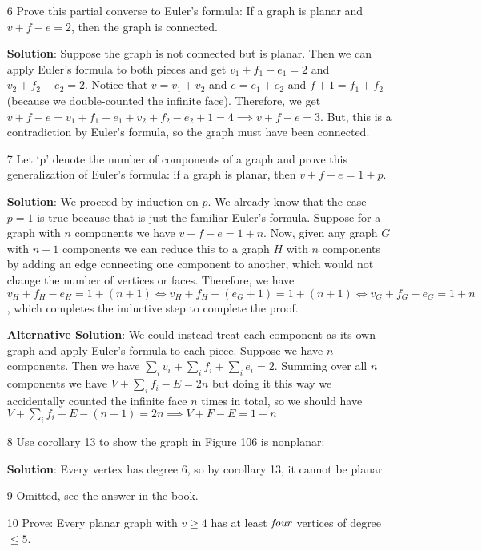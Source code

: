 \documentclass{article}
\begin{document}
\begin{enumerate}
	\item[6] Prove this partial converse to Euler's formula: If a graph is planar and $v + f - e = 2$, then the graph is connected.
	
	\textbf{Solution}: Suppose the graph is not connected but is planar. Then we can apply Euler's formula to both pieces and get $v_1 + f_1 - e_1 = 2$ and $v_2 + f_2 - e_2 = 2$. Notice that $v = v_1 + v_2$ and $e = e_1 + e_2$ and $f + 1= f_1 + f_2$ (because we double-counted the infinite face). Therefore, we get $v + f - e = v_1 + f_1 - e_1 + v_2 + f_2 - e_2 + 1 = 4 \implies v + f - e = 3$. But, this is a contradiction by Euler's formula, so the graph must have been connected.
	
	\item[7] Let `p' denote the number of components of a graph and prove this generalization of Euler's formula: if a graph is planar, then $v + f - e = 1 + p$.
	
	\textbf{Solution}: We proceed by induction on $p$. We already know that the case $p = 1$ is true because that is just the familiar Euler's formula. Suppose for a graph with $n$ components we have $v + f - e = 1 + n$. Now, given any graph $G$ with $n + 1$ components we can reduce this to a graph $H$ with $n$ components by adding an edge connecting one component to another, which would not change the number of vertices or faces. Therefore, we have $v_H + f_H - e_H = 1 + (n + 1) \iff v_H + f_H - (e_G + 1) = 1 + (n + 1) \iff v_G + f_G - e_G = 1 + n$, which completes the inductive step to complete the proof.
	
	\textbf{Alternative Solution}: We could instead treat each component as its own graph and apply Euler's formula to each piece. Suppose we have $n$ components. Then we have $\sum_{i}{v_i} + \sum_{i}{f_i} + \sum_{i}{e_i} = 2$. Summing over all $n$ components we have $V + \sum_{i}{f_i} - E = 2n$ but doing it this way we accidentally counted the infinite face $n$ times in total, so we should have $V + \sum_{i}{f_i} - E - (n - 1) = 2n \implies V + F - E = 1 + n$

	\item[8] Use corollary 13 to show the graph in Figure 106 is nonplanar:
	
	\textbf{Solution}: Every vertex has degree 6, so by corollary 13, it cannot be planar.
	
	\item[9] Omitted, see the answer in the book.
	
	\item[10] Prove: Every planar graph with $v \geq 4$ has at least $\it{four}$ vertices of degree $\leq 5$.
	

\end{enumerate}
\end{document}
